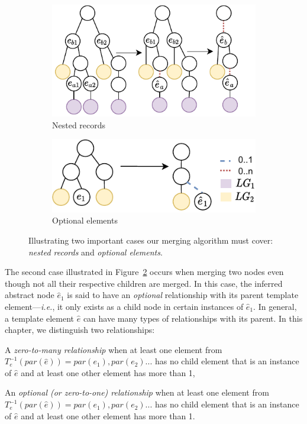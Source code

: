 \begin{figure}[ht]
  \centering
  \begin{subfigure}{0.4\textwidth}
    \centering
    \includegraphics[width=.9\linewidth]{appstract/explanations/intra-recursivity}
    \caption{Nested records}
    \label{fig:nested_records}
  \end{subfigure}
  \begin{subfigure}{0.4\textwidth}
    \centering 
    \includegraphics[width=.9\linewidth]{appstract/explanations/intra-optional}
    \caption{Optional elements}
    \label{fig:optional_elements}
  \end{subfigure}
  \caption{Illustrating two important cases our merging algorithm must cover: \emph{nested records} and \emph{optional elements}.}
  \label{fig:intra-use-cases}
\end{figure}

The second case illustrated in Figure~\ref{fig:optional_elements} occurs when merging two nodes even though not all their respective children are merged.
In this case, the inferred abstract node $\hat{e}_1$ is said to have an \textit{optional} relationship with its parent template element---\emph{i.e.}, it only exists as a child node in certain instances of $\hat{e}_1$.
In general, a template element $\hat{e}$ can have many types of relationships with its parent.
In this chapter, we distinguish two relationships:
\begin{compactitem}
    \item A \emph{zero-to-many relationship} when at least one element from $T^{-1}_e(par(\hat{e})) = par(e_1), par(e_2)...$ has no child element that is an instance of $\hat{e}$ and at least one other element has more than 1,
    \item An \emph{optional (or zero-to-one) relationship} when at least one element from $T^{-1}_e(par(\hat{e})) = par(e_1), par(e_2)...$ has no child element that is an instance of $\hat{e}$ and at least one other element has more than 1.
\end{compactitem}

